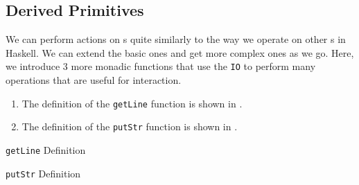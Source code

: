 \subsection{Derived Primitives}\label{subsec:Derived_Primitives}
We can perform actions on s quite similarly to the way we operate on other s in Haskell.
We can extend the basic ones and get more complex ones as we go.
Here, we introduce 3 more monadic functions that use the \texttt{IO}  to perform many operations that are useful for interaction.
\begin{enumerate}[noitemsep]
\item {}\label{act:IO_getLine}
  The definition of the \texttt{getLine} function is shown in .
\item {}\label{act:IO_putStr}
  The definition of the \texttt{putStr} function is shown in .
\end{enumerate}

\begin{listing}[h!tbp]
\caption{\texttt{getLine} Definition}
\label{lst:IO_getLine_Definition}
\end{listing}

\begin{listing}[h!tbp]
\caption{\texttt{putStr} Definition}
\label{lst:IO_putStr_Definition}
\end{listing}


